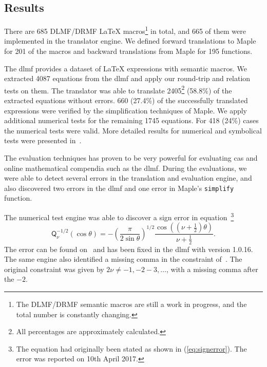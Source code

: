 \documentclass[a4paper,11pt]{article}
\newcommand{\DLMF}{DLMF}
\newcommand{\DRMF}{DRMF}
\newcommand{\Maple}{Maple}
\newcommand{\Macro}{\DLMF/\DRMF{} \LaTeX{} macro}
\theoremstyle{defTheoStyle}
\theoremstyle{defExampStyle}
\begin{document}
\subsection{Results}\label{sec:test-summary}
There are 685 \Macro{}s\footnote{The DLMF/DRMF semantic macros are still a work in progress, and the total number is constantly changing.} in total, and 665 of them were implemented in the translator engine. We defined forward translations to \Maple{} for 201 of the macros and backward translations from \Maple{} for 195 functions. 

The \gls*{dlmf} provides a dataset of \LaTeX{} expressions with semantic macros. We extracted 4087 equations from the \gls*{dlmf} and apply our round-trip and relation tests on them. The translator was able to translate 2405\footnote{All percentages are approximately calculated.} (58.8\%) of the extracted equations without errors. 660 (27.4\%) of the successfully translated expressions were verified by the simplification techniques of \Maple. We apply additional numerical tests for the remaining 1745 equations. For 418 (24\%) cases the numerical tests were valid. More detailed results for numerical and symbolical tests were presented in~\parencite{NumericalTests:Paper}.


The evaluation techniques has proven to be very powerful for evaluating \gls*{cas} and online mathematical compendia such as the \gls*{dlmf}. During the evaluations, we were able to detect several errors in the translation and evaluation engine, and also discovered two errors in the \gls*{dlmf} and one error in \Maple's \texttt{simplify} function.

The numerical test engine was able to discover a sign error in equation~\parencite[(14.5.14)]{NIST:DLMF}\footnote{The equation had originally been stated as shown in (\ref{eq:signerror}). The error was reported on 10th April 2017.}
\begin{equation}\label{eq:signerror}
\displaystyle \mathsf{Q}^{-1/2}_{\nu}\left(\cos\theta\right)=-\left(\frac{\pi}{2\sin\theta}\right)^{1/2}\frac{\cos\left(\left(\nu+\frac{1}{2}\right)\theta\right)}{\nu+\frac{1}{2}}.
\end{equation}
The error can be found on~\parencite[p. 359]{NIST:Handbook} and has been fixed in the \gls*{dlmf} with version 1.0.16. The same engine also identified a missing comma in the constraint of~\parencite[(10.16.7)]{NIST:DLMF}. The original constraint was given by $2\nu \neq -1, -2 -3, \ldots$, with a missing comma after the $-2$.
\end{document}
